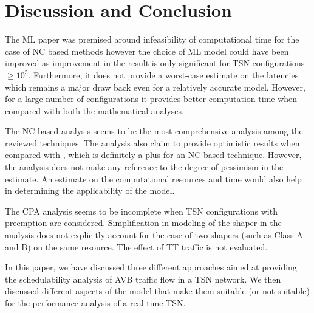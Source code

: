 \documentclass[journal,12pt,twocolumn]{IEEEtran}
\begin{document}
\section{Discussion and Conclusion}
The ML paper \cite{ML} was premised around infeasibility of computational time for the case of NC based methods however the choice of ML model could have been improved as improvement in the result is only significant for TSN configurations $\geq 10^5$. Furthermore, it does not provide a worst-case estimate on the latencies which remains a major draw back even for a relatively accurate model. However, for a large number of configurations it provides better computation time when compared with both the mathematical analyses.

The NC based analysis \cite{NC} seems to be the most comprehensive analysis among the reviewed techniques. The analysis also claim to provide optimistic results when compared with \cite{NCCOMPARE}, which is definitely a plus for an NC based technique. However, the analysis does not make any reference to the degree of pessimism in the estimate. An estimate on the computational resources and time would also help in determining the applicability of the model.

The CPA analysis \cite{CPA} seems to be incomplete when TSN configurations with preemption are considered. Simplification in modeling of the shaper in the analysis does not explicitly account for the case of two shapers (such as Class A and B) on the same resource. The effect of TT traffic is not evaluated.

In this paper, we have discussed three different approaches aimed at  providing the schedulability analysis of AVB traffic flow in a TSN network. We then discussed different aspects of the model that make them suitable (or not suitable) for the performance analysis of a real-time TSN. 


\end{document}
